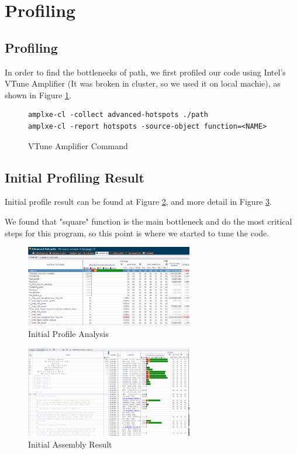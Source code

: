 \section{Profiling}\label{sec:profiling}
\subsection{Profiling}
In order to find the bottlenecks of path, we first profiled our code
using Intel's VTune Amplifier (It was broken in cluster, so we used
it on local machie), as shown in Figure \ref{amplxe-command}.

\vspace{0.3cm}

\begin{figure}[H]
\footnotesize
\begin{verbatim}
amplxe-cl -collect advanced-hotspots ./path
amplxe-cl -report hotspots -source-object function=<NAME>
\end{verbatim}
\caption{VTune Amplifier Command}
\label{amplxe-command}
\end{figure}

\subsection{Initial Profiling Result}
Initial profile result can be found at Figure \ref{initial_profile_result_0},
and more detail in Figure \ref{initial_profile_result_1}.

We found that "square" function is the main bottleneck and do the most critical
steps for this program, so this point is where we started to tune the code.

\begin{figure}[H]
    \centering
    \includegraphics[width=0.65\textwidth]{figs/0_analysis.png}
    \caption{Initial Profile Analysis}
    \label{initial_profile_result_0}
\end{figure}

\begin{figure}[H]
    \centering
    \includegraphics[width=0.65\textwidth]{figs/0_assembly.png}
    \caption{Initial Assembly Result}
    \label{initial_profile_result_1}
\end{figure}

